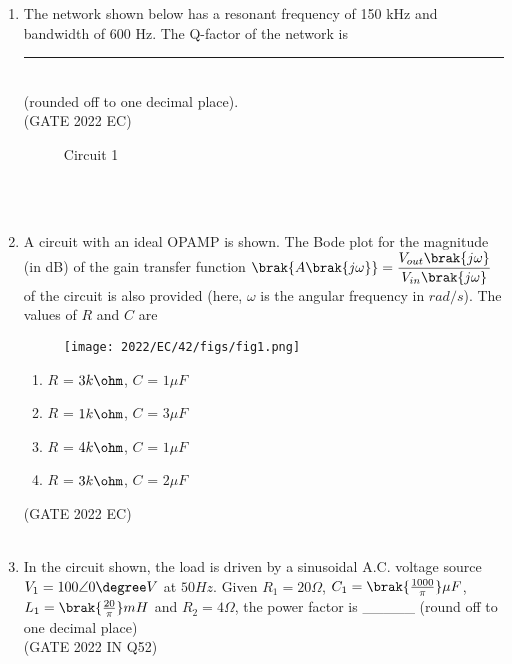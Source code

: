 \begin{enumerate}[label=\thechapter.\arabic*,ref=\thechapter.\theenumi]
\item The network shown below has a resonant frequency of 150 kHz and bandwidth of 600
Hz. The Q-factor of the network is \rule{1cm}{0.15mm}\\
(rounded off to one decimal place).\\
\hfill(GATE 2022 EC)\\
\begin{figure}[ht]
  \centering
  
      
  
  \caption{Circuit 1}
\end{figure}\\
\solution\\

\pagebreak
\item A circuit with an ideal OPAMP is shown. The Bode plot for the magnitude (in dB)
 of the gain transfer function $ \brak{A \brak{j \omega}} = \dfrac{ V_{out}\brak{j \omega}}{V_{in}\brak{j \omega}}$ of the circuit is also
provided (here, $\omega$ is the angular frequency in $ rad/s $). The values of $R$ and $C$ are 
\begin{figure}[ht]
	\centering
    \texttt{[image: 2022/EC/42/figs/fig1.png]}
    \label{fig:2022.42.39}
\end{figure} 
\begin{enumerate}[label = (\Alph*)]
     \item $R$ = $3k\ohm$,  $C$ = $1\mu F$\\
     \item $R$ = $1k\ohm$,  $C$ = $3\mu F$\\
     \item $R$ = $4k\ohm$,  $C$ = $1\mu F$\\
     \item $R$ = $3k\ohm$,  $C$ = $2\mu F$\\
\end{enumerate}
\hfill(GATE 2022 EC)\\
\solution\\

\pagebreak

\item  In the circuit shown, the load is driven by a sinusoidal A.C. voltage source $V_1 = 100\angle0\degree V$ at $50Hz$. Given $R_1 = 20\Omega$, $C_1 = \brak{\frac{1000}{\pi}}\mu F$, $L_1 = \brak{\frac{20}{\pi}}mH$ and $R_2 = 4\Omega$, the power factor is \_\_\_\_\_ (round off to one decimal place)\\
\hfill(GATE 2022 IN Q52)

\solution

\pagebreak


\end{enumerate}
